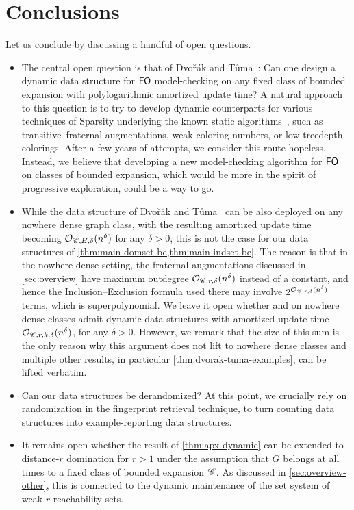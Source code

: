 \section{Conclusions}\label{sec:conclusions}

Let us conclude by discussing a handful of open questions.
\begin{itemize}
	\item The central open question is that of Dvo\v{r}\'ak and T\r{u}ma~\cite{DvorakT13}: Can one design a dynamic data structure for $\mathsf{FO}$ model-checking on any fixed  class of bounded expansion with polylogarithmic amortized update time? A natural approach to this question is to try to develop dynamic counterparts for various techniques of Sparsity underlying the known static algorithms~\cite{DvorakKT13,grohe2011methods,PilipczukST18}, such as transitive--fraternal augmentations, weak coloring numbers, or low treedepth colorings. After a few years of attempts, we consider this route hopeless. Instead, we believe that developing a new model-checking algorithm for $\mathsf{FO}$ on classes of bounded expansion, which would be more in the spirit of progressive exploration, could be a way to go.
	\item While the data structure of Dvo\v{r}\'ak and T\r{u}ma~\cite{DvorakT13} can be also deployed on any nowhere dense graph class, with the resulting amortized update time becoming $\mathcal{O}_{\mathscr C,H,\delta}(n^\delta)$ for any $\delta>0$, this is not the case for our data structures of \cref{thm:main-domset-be,thm:main-indset-be}. The reason is that in the nowhere dense setting, the fraternal augmentations discussed in \cref{sec:overview} have maximum outdegree $\mathcal{O}_{\mathscr C,r,\delta}(n^\delta)$ instead of a constant, and hence the Inclusion--Exclusion formula used there may involve $2^{\mathcal{O}_{\mathscr C,r,\delta}(n^\delta)}$ terms, which is superpolynomial. We leave it open whether  and  on nowhere dense classes admit dynamic data structures with amortized update time $\mathcal{O}_{\mathscr C,r,k,\delta}(n^\delta)$, for any $\delta>0$. However, we remark that the size of this sum is the only reason why this argument does not lift to nowhere dense classes and multiple other results, in particular \cref{thm:dvorak-tuma-examples}, can be lifted verbatim.
	\item Can our data structures be derandomized? At this point, we crucially rely on randomization in the fingerprint retrieval technique, to turn counting data structures into example-reporting data structures.
	\item It remains open whether the result of \cref{thm:apx-dynamic} can be extended to distance-$r$ domination for $r>1$ under the assumption that $G$ belongs at all times to a fixed class of bounded expansion $\mathscr C$. As discussed in \cref{sec:overview-other}, this is connected to the dynamic maintenance of the set system of weak $r$-reachability sets.
\end{itemize}
